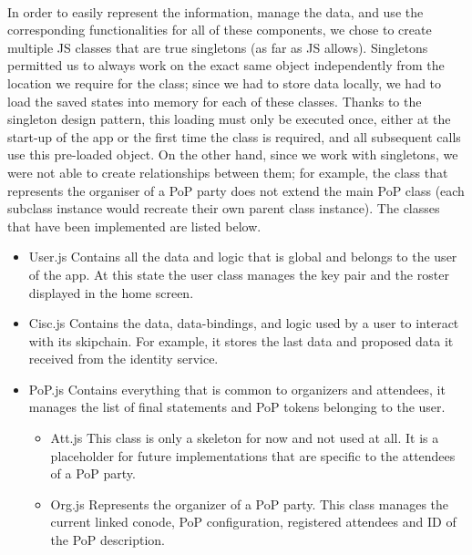 \paragraph{}
In order to easily represent the information, manage the data, and use the corresponding functionalities for all of these components, we chose to create multiple JS classes that are true singletons (as far as JS allows). Singletons permitted us to always work on the exact same object independently from the location we require for the class; since we had to store data locally, we had to load the saved states into memory for each of these classes. Thanks to the singleton design pattern, this loading must only be executed once, either at the start-up of the app or the first time the class is required, and all subsequent calls use this pre-loaded object. On the other hand, since we work with singletons, we were not able to create relationships between them; for example, the class that represents the organiser of a PoP party does not extend the main PoP class (each subclass instance would recreate their own parent class instance). The classes that have been implemented are listed below.

\begin{itemize}
\item User.js \linebreak Contains all the data and logic that is global and belongs to the user of the app. At this state the user class manages the key pair and the roster displayed in the home screen.

\item Cisc.js \linebreak Contains the data, data-bindings, and logic used by a user to interact with its skipchain. For example, it stores the last data and
proposed data it received from the identity service.

\item PoP.js \linebreak Contains everything that is common to organizers and attendees, it manages the list of final statements and PoP tokens belonging to the user.
\begin{itemize}
\item Att.js \linebreak This class is only a skeleton for now and not used at all. It is a placeholder for future implementations that are specific to the attendees of a PoP party.

\item Org.js \linebreak Represents the organizer of a PoP party. This class manages the current linked conode, PoP configuration, registered attendees and ID of the PoP description.
\end{itemize}
\end{itemize}

